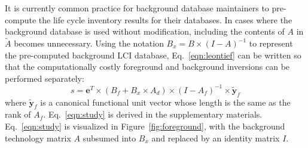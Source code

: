 
It is currently common practice for background database maintainers to pre-compute the life cycle inventory results for their databases.  In cases where the background database is used without modification, including the contents of $A$ in $\tilde{A}$ becomes unnecessary.
Using the notation $B_x = B \times (I - A)^{-1}$ to represent the pre-computed background LCI database, %
%
Eq.~\ref{eqn:leontief} can be written so that the computationally costly foreground and background inversions can be performed separately:
\begin{equation}
s = \mathbf{e}^T \times (B_f + B_x\times A_d) \times (I - A_f)^{-1} \times \tilde{\mathbf{y}}_f
\label{eqn:study}
\end{equation}
where $\tilde{\mathbf{y}}_f$ is a canonical functional unit vector whose length is the same as the rank of $A_f$. Eq.~\ref{eqn:study} is derived in the supplementary materials.
Eq.~\ref{eqn:study} is visualized in Figure~\ref{fig:foreground}, with the background technology matrix $A$ subsumed into $B_x$ and replaced by an identity matrix $I$.  

